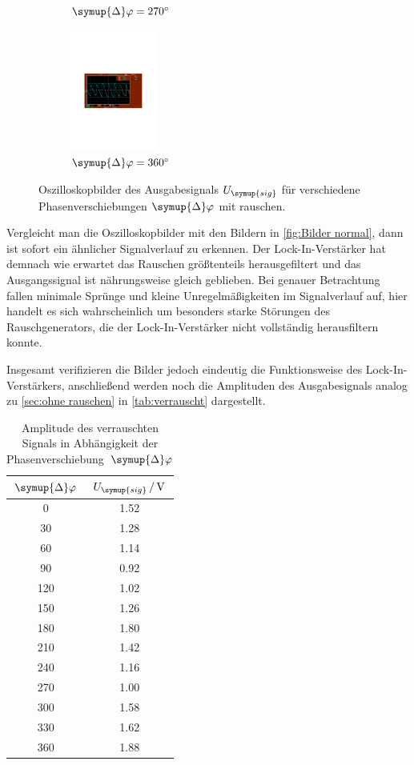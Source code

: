 \begin{figure} [H]
\begin{subfigure}{0.48\textwidth}
    \caption{$\symup{\Delta}\varphi = \qty{270}{\degree}$}
  \end{subfigure}
  \begin{subfigure}{0.48\textwidth}
    \centering
    \includegraphics[height=4cm]{content/Bilder/verrauscht/360.pdf}
    \caption{$\symup{\Delta}\varphi = \qty{360}{\degree}$}
  \end{subfigure}
  \caption{Oszilloskopbilder des Ausgabesignals $U_{\symup{sig}}$ für verschiedene Phasenverschiebungen $\symup{\Delta}\varphi$ mit rauschen.}
  \label{fig:Bilder rausch}
\end{figure}

Vergleicht man die Oszilloskopbilder mit den Bildern in \autoref{fig:Bilder normal}, dann ist sofort
ein ähnlicher Signalverlauf zu erkennen.
Der Lock-In-Verstärker hat demnach wie erwartet das Rauschen größtenteils herausgefiltert und das Ausgangssignal
ist nährungsweise gleich geblieben.
Bei genauer Betrachtung fallen minimale Sprünge und kleine Unregelmäßigkeiten im Signalverlauf auf,
hier handelt es sich wahrscheinlich um besonders starke Störungen des Rauschgenerators, die der Lock-In-Verstärker
nicht vollständig herausfiltern konnte.

Insgesamt verifizieren die Bilder jedoch eindeutig die Funktionsweise des Lock-In-Verstärkers, anschließend
werden noch die Amplituden des Ausgabesignals analog zu \autoref{sec:ohne rauschen} in \autoref{tab:verrauscht} dargestellt.

\begin{table} [H]
  \centering
  \caption{Amplitude des verrauschten Signals in Abhängigkeit der Phasenverschiebung~$\symup{\Delta}\varphi$}
  \label{tab:verrauscht}
  \begin{tabular}{S[table-format=3.0] S[table-format=1.2]}
    \toprule
    {$\symup{\Delta}\varphi$} & {$U_{\symup{sig}}\,/\,\unit{\volt}$} \\
    	  & 1.52 \\
    30	& 1.28 \\
    60	& 1.14 \\
    90	& 0.92 \\
    120	& 1.02 \\
    150	& 1.26 \\
    180	& 1.80 \\
    210	& 1.42 \\
    240	& 1.16 \\
    270	& 1.00 \\
    300	& 1.58 \\
    330	& 1.62 \\
    360	& 1.88 \\
    \bottomrule
  \end{tabular}
\end{table}

